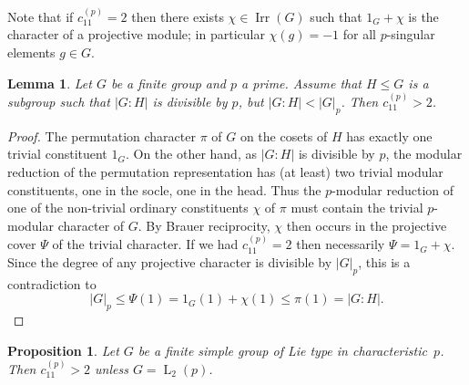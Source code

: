\documentclass{ert-l}
\newcommand{\Irr}{{\operatorname{Irr}}}
\newcommand{\PSL}{{\operatorname{L}}}
\newtheorem{lem}[thm]{Lemma}
\newtheorem{prop}[thm]{Proposition}
\theoremstyle{remark}
\begin{document}
Note that if $c_{11}^{(p)}=2$ then there exists $\chi\in\Irr(G)$ such that
$1_G+\chi$ is the character of a projective module; in particular $\chi(g)=-1$
for all $p$-singular elements $g\in G$.

\begin{lem}   \label{lem:main}
 Let $G$ be a finite group and $p$ a prime. Assume that $H\le G$ is a
 subgroup such that $|G:H|$ is divisible by $p$, but $|G:H|<|G|_p$. Then
 $c_{11}^{(p)}>2$.
\end{lem}

\begin{proof}
The permutation character $\pi$ of $G$ on the cosets of $H$ has exactly one
trivial constituent $1_G$. On the other hand, as $|G:H|$ is divisible by $p$,
the modular reduction of the permutation representation has (at least) two
trivial modular constituents, one in the socle, one in the head. Thus the
$p$-modular reduction of one of the non-trivial ordinary constituents $\chi$
of $\pi$ must contain the trivial $p$-modular character of $G$. By Brauer
reciprocity,
$\chi$ then occurs in the projective cover $\Psi$ of the trivial character. If
we had $c_{11}^{(p)}=2$ then necessarily $\Psi=1_G+\chi$. Since the degree of
any projective character is divisible by $|G|_p$, this is a contradiction to
$$|G|_p\le\Psi(1)=1_G(1)+\chi(1)\le\pi(1)=|G:H|.$$
\end{proof}

\begin{prop}   \label{main}
 Let $G$ be a finite simple group of Lie type in characteristic~$p$. Then
 $c_{11}^{(p)}>2$ unless $G=\PSL_2(p)$.
\end{prop}
\end{document}
